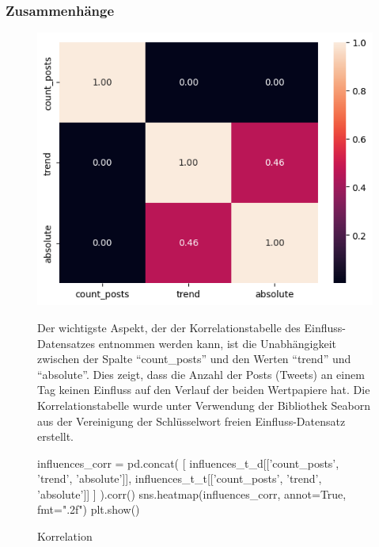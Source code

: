 \documentclass{article}
\begin{document}
\subsubsection{Zusammenhänge}
\begin{figure}[!htb]
	\begin{minipage}{0.4\textwidth}
    		\includegraphics[width=\textwidth]{../imgs/Korrelation.png}
    		\caption{Korrelation}
    		\label{fig:Korrelation}
  	\end{minipage}
  	\hfill
	\begin{minipage}{0.55\textwidth}
		Der wichtigste Aspekt, der der Korrelationstabelle des Einfluss-Datensatzes entnommen werden kann, ist die Unabhängigkeit zwischen der Spalte ``count\_posts'' und den Werten ``trend'' und ``absolute''.
		Dies zeigt, dass die Anzahl der Posts (Tweets) an einem Tag keinen Einfluss auf den Verlauf der beiden Wertpapiere hat.
		Die Korrelationstabelle wurde unter Verwendung der Bibliothek Seaborn aus der Vereinigung der Schlüsselwort freien Einfluss-Datensatz erstellt.
	\begin{python}
	influences_corr = pd.concat(
	    [
	        influences_t_d[['count_posts', 'trend', 'absolute']],
	        influences_t_t[['count_posts', 'trend', 'absolute']]
	    ]
	).corr()
	sns.heatmap(influences_corr, annot=True, fmt=".2f")
	plt.show()
	\end{python}
		
	\end{minipage}
\end{figure}
\end{document}

